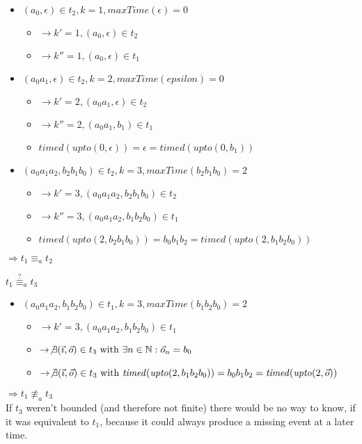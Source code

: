 \begin{exmp}[name=Observational Equivalence]
\begin{itemize}[label={}]
    \item \((a_0, \epsilon)               \in t_2, k = 1, \mathit{maxTime}(\epsilon) = 0\)
      \begin{itemize}[label={}]
        \item \(\rightarrow k' = 1, (a_0, \epsilon)     \in t_2\)
        \item \(\rightarrow k'' = 1, (a_0, \epsilon)     \in t_1\)
      \end{itemize}
    \item \((a_0a_1, \epsilon)            \in t_2, k = 2, \mathit{maxTime}(epsilon) = 0\)
      \begin{itemize}[label={}]
        \item \(\rightarrow k' = 2, (a_0a_1, \epsilon)    \in t_2\)
        \item \(\rightarrow k'' = 2, (a_0a_1, b_1)    \in t_1\)
        \item \(\mathit{timed}(\mathit{upto}(0, \epsilon)) = \epsilon = \mathit{timed}(\mathit{upto}(0, b_1))\)
      \end{itemize}
    \item \((a_0a_1a_2, b_2b_1b_0)        \in t_2, k = 3, \mathit{maxTime}(b_2b_1b_0) = 2\)
      \begin{itemize}[label={}]
        \item \(\rightarrow k' = 3, (a_0a_1a_2, b_2b_1b_0)    \in t_2\)
        \item \(\rightarrow k'' = 3, (a_0a_1a_2, b_1b_2b_0)    \in t_1\)
        \item \(\mathit{timed}(\mathit{upto}(2, b_2b_1b_0)) = b_0b_1b_2 = \mathit{timed}(\mathit{upto}(2, b_1b_2b_0))\)
      \end{itemize}
  \end{itemize}
  \(\Rightarrow t_1 \equiv_a t_2\)

  \(t_1 \stackrel{?}{\equiv}_a t_3\)
  \begin{itemize}[label={}]
    \item \((a_0a_1a_2,b_1b_2b_0)      \in t_1, k=3, \mathit{maxTime}(b_1b_2b_0) = 2\)
      \begin{itemize}[label={}]
        \item \(\rightarrow k' = 3, (a_0a_1a_2, b_1b_2b_0)    \in t_1\)
        \item \(\rightarrow \not\exists (\vec{\imath}, \vec{o}) \in t_3\ \text{with } \exists n \in \mathbb{N}: \vec{o}_n = b_0\)
        \item \(\rightarrow \not\exists (\vec{\imath}, \vec{o}) \in t_3\ \text{with } \mathit{timed}(\mathit{upto}(2, b_1b_2b_0)) = b_0b_1b_2 = \mathit{timed}(\mathit{upto}(2,\vec{o}))\)
      \end{itemize}
  \end{itemize}
  \(\Rightarrow t_1 \not\equiv_a t_3\)\\
  If \(t_3\) weren't bounded (and therefore not finite) there would be no way to know, if it was equivalent to \(t_1\), because it could always produce a missing event at a later time.


\end{exmp}
